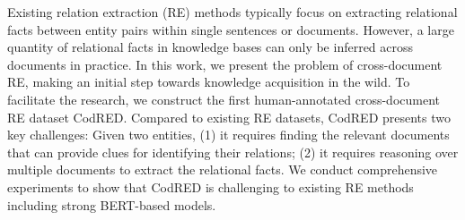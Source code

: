 Existing relation extraction (RE) methods typically focus on extracting relational facts between entity pairs within single sentences or documents. However, a large quantity of relational facts in knowledge bases can only be inferred across documents in practice. In this work, we present the problem of cross-document RE, making an initial step towards knowledge acquisition in the wild. To facilitate the research, we construct the first human-annotated cross-document RE dataset CodRED. Compared to existing RE datasets, CodRED presents two key challenges: Given two entities, (1) it requires finding the relevant documents that can provide clues for identifying their relations; (2) it requires reasoning over multiple documents to extract the relational facts. We conduct comprehensive experiments to show that CodRED is challenging to existing RE methods including strong BERT-based models.
